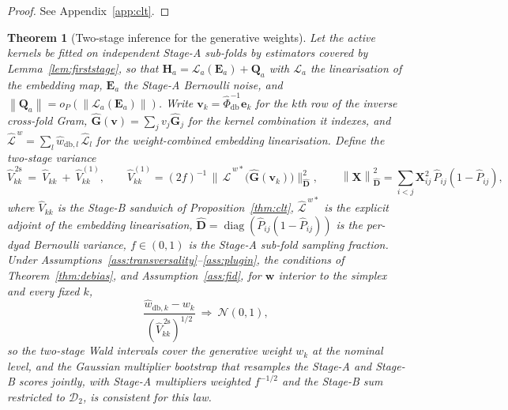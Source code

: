 \documentclass[12pt]{article}
\newtheorem{theorem}{Theorem}
\newcommand{\1}{\mathbf{1}}
\newcommand{\bw}{\mathbf{w}}
\newcommand{\norm}[1]{\left\lVert#1\right\rVert}
\DeclareMathOperator{\diag}{diag}
\begin{document}
\begin{proof}
See Appendix~\ref{app:clt}.
\end{proof}

\begin{theorem}[Two-stage inference for the generative weights]
\label{thm:twostage}
Let the active kernels be fitted on independent Stage-A sub-folds by estimators covered by
Lemma~\ref{lem:firststage}, so
that $\mathbf H_a=\mathcal L_a(\mathbf E_a)+\mathbf Q_a$ with $\mathcal L_a$ the linearisation of the
embedding map, $\mathbf E_a$ the Stage-A Bernoulli noise, and $\norm{\mathbf Q_a}=o_P(\norm{\mathcal
L_a(\mathbf E_a)})$. Write $\mathbf v_k=\widehat\Phi_{\mathrm{db}}^{-1}\mathbf e_k$ for the $k$th row
of the inverse cross-fold Gram, $\widehat{\mathbf G}(\mathbf v)=\sum_j v_j\widehat{\mathbf G}_j$ for the
kernel combination it indexes, and $\widehat{\mathcal L}^{\,w}=\sum_l\widehat w_{\mathrm{db},l}\,
\widehat{\mathcal L}_l$ for the weight-combined embedding linearisation. Define the two-stage variance
\[
\widehat V^{\,\mathrm{2s}}_{kk}\ =\ \widehat V_{kk}\ +\ \widehat V^{(1)}_{kk},\qquad
\widehat V^{(1)}_{kk}=(2f)^{-1}\,\bigl\|\,\widehat{\mathcal L}^{\,w\ast}\!\bigl(\widehat{\mathbf
G}(\mathbf v_k)\bigr)\bigr\|_{\widehat{\mathbf D}}^2,\qquad
\norm{\mathbf X}_{\widehat{\mathbf D}}^2=\sum_{i<j}\mathbf X_{ij}^2\,\widehat P_{ij}(1-\widehat P_{ij}),
\]
where $\widehat V_{kk}$ is the Stage-B sandwich of Proposition~\ref{thm:clt}, $\widehat{\mathcal
L}^{\,w\ast}$ is the explicit adjoint of the embedding linearisation, $\widehat{\mathbf
D}=\diag(\widehat P_{ij}(1-\widehat P_{ij}))$ is the per-dyad Bernoulli variance, $f\in(0,1)$ is the Stage-A sub-fold sampling fraction. Under
Assumptions~\ref{ass:transversality}--\ref{ass:plugin}, the conditions of
Theorem~\ref{thm:debias}, and Assumption~\ref{ass:fid}, for $\bw$ interior to the simplex and every fixed $k$,
\[
\frac{\widehat w_{\mathrm{db},k}-w_k}{(\widehat V^{\,\mathrm{2s}}_{kk})^{1/2}}\ \Longrightarrow\
\mathcal N(0,1),
\]
so the two-stage Wald intervals cover the generative weight $w_k$ at the nominal level, and the
Gaussian multiplier bootstrap that resamples the Stage-A and Stage-B scores jointly, with Stage-A
multipliers weighted $f^{-1/2}$ and the Stage-B sum restricted to $\mathcal D_2$, is consistent for
this law.
\end{theorem}
\end{document}
